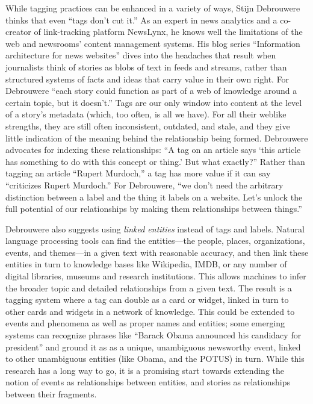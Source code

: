 While tagging practices can be enhanced in a variety of ways, Stijn Debrouwere thinks that even ``tags don't cut it.''\autocite[``Tags don't cut it'']{debrouwere_information_2010} As an expert in news analytics and a co-creator of link-tracking platform NewsLynx, he knows well the limitations of the web and newsrooms' content management systems. His blog series ``Information architecture for news websites'' dives into the headaches that result when journalists think of stories as blobs of text in feeds and streams, rather than structured systems of facts and ideas that carry value in their own right. For Debrouwere ``each story could function as part of a web of knowledge around a certain topic, but it doesn't.'' Tags are our only window into content at the level of a story's metadata (which, too often, is all we have). For all their weblike strengths, they are still often inconsistent, outdated, and stale, and they give little indication of the meaning behind the relationship being formed. Debrouwere advocates for indexing these relationships: ``A tag on an article says `this article has something to do with this concept or thing.' But what exactly?'' Rather than tagging an article ``Rupert Murdoch,'' a tag has more value if it can say ``criticizes Rupert Murdoch.'' For Debrouwere, ``we don't need the arbitrary distinction between a label and the thing it labels on a website. Let's unlock the full potential of our relationships by making them relationships between things.''

Debrouwere also suggests using \emph{linked entities} instead of tags and labels. Natural language processing tools can find the entities---the people, places, organizations, events, and themes---in a given text with reasonable accuracy, and then link these entities in turn to knowledge bases like Wikipedia, IMDB, or any number of digital libraries, museums and research institutions. This allows machines to infer the broader topic and detailed relationships from a given text. The result is a tagging system where a tag can double as a card or widget, linked in turn to other cards and widgets in a network of knowledge. This could be extended to events and phenomena as well as proper names and entities; some emerging systems can recognize phrases like ``Barack Obama announced his candidacy for president'' and ground it as as a unique, unambiguous newsworthy event, linked to other unambiguous entities (like Obama, and the POTUS) in turn.\autocite{nothman_grounding_2013} While this research has a long way to go, it is a promising start towards extending the notion of events as relationships between entities, and stories as relationships between their fragments.

